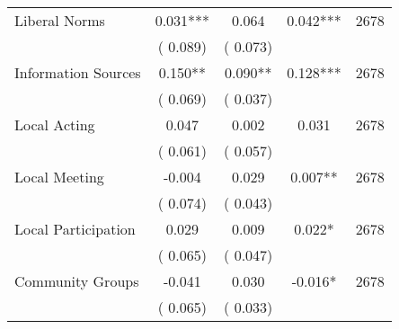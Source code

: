\begin{tabular}{l*{4}{c}}
 Liberal Norms &              0.031*** &         0.064 &           0.042*** & 2678                       \\  
                 &        (       0.089)                   &        (       0.073)                        &                                                             &                                                      \\      

 Information Sources &              0.150** &         0.090** &           0.128*** & 2678                       \\  
                 &        (       0.069)                   &        (       0.037)                        &                                                             &                                                      \\      

 Local Acting &              0.047 &         0.002 &           0.031 & 2678                       \\  
                 &        (       0.061)                   &        (       0.057)                        &                                                             &                                                      \\      

 Local Meeting &             -0.004 &         0.029 &           0.007** & 2678                       \\  
                 &        (       0.074)                   &        (       0.043)                        &                                                             &                                                      \\      

 Local Participation &              0.029 &         0.009 &           0.022* & 2678                       \\  
                 &        (       0.065)                   &        (       0.047)                        &                                                             &                                                      \\      

 Community Groups &             -0.041 &         0.030 &          -0.016* & 2678                       \\  
                 &        (       0.065)                   &        (       0.033)                        &                                                             &                                                      \\      

\hline \end{tabular}                                                                                                              
